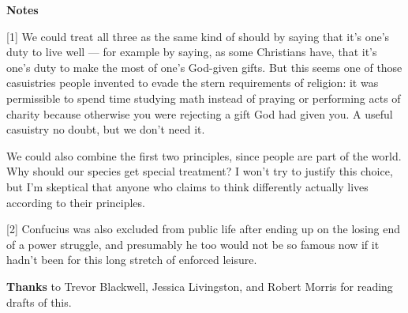 \textbf{Notes}

{[}1{]} We could treat all three as the same kind of should by saying
that it's one's duty to live well --- for example by saying, as some
Christians have, that it's one's duty to make the most of one's
God-given gifts. But this seems one of those casuistries people invented
to evade the stern requirements of religion: it was permissible to spend
time studying math instead of praying or performing acts of charity
because otherwise you were rejecting a gift God had given you. A useful
casuistry no doubt, but we don't need it.

We could also combine the first two principles, since people are part of
the world. Why should our species get special treatment? I won't try to
justify this choice, but I'm skeptical that anyone who claims to think
differently actually lives according to their principles.

{[}2{]} Confucius was also excluded from public life after ending up on
the losing end of a power struggle, and presumably he too would not be
so famous now if it hadn't been for this long stretch of enforced
leisure.

\textbf{Thanks} to Trevor Blackwell, Jessica Livingston, and Robert
Morris for reading drafts of this.
